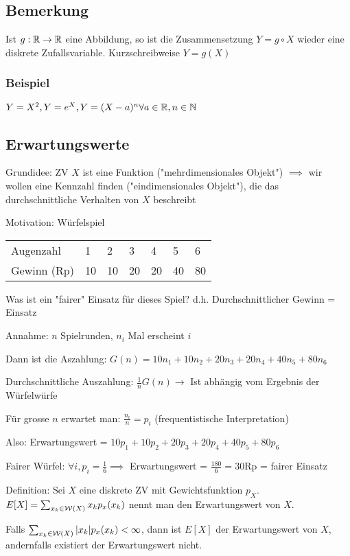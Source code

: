 \subsection{Bemerkung}
\enumstart
	\item Ist $g: \mathbb{R} \rightarrow \mathbb{R}$ eine Abbildung, so ist die Zusammensetzung $Y = g \circ X$ wieder eine diskrete Zufallsvariable. Kurzschreibweise $Y = g(X)$
\enumend

\subsubsection{Beispiel}
\enumstart
	\item $Y = X^2, Y = e^X, Y = (X-a)^n \forall a \in \mathbb{R}, n \in \mathbb{N}$
\enumend

\subsection{Erwartungswerte}
\enumstart
	\item Grundidee: ZV $X$ ist eine Funktion ("mehrdimensionales Objekt") $\implies$ wir wollen eine Kennzahl finden ("eindimensionales Objekt"), die das durchschnittliche Verhalten von $X$ beschreibt
	\item Motivation: Würfelspiel\\
	\begin{tabular}{lllllll}
		Augenzahl & 1 & 2 & 3 & 4 & 5 & 6\\
		Gewinn (Rp) & 10 & 10 & 20 & 20 & 40 & 80\\
	\end{tabular}
	\enumstart
		\item Was ist ein "fairer" Einsatz für dieses Spiel? d.h. Durchschnittlicher Gewinn = Einsatz
		\item Annahme: $n$ Spielrunden, $n_i$ Mal erscheint $i$
		\item Dann ist die Aszahlung: $G(n) = 10n_1 + 10n_2 + 20n_3 + 20n_4 + 40n_5 + 80n_6$
		\item Durchschnittliche Auszahlung: $\frac{1}{n}G(n) \rightarrow$ Ist abhängig vom Ergebnis der Würfelwürfe
		\item Für grosse $n$ erwartet man: $\frac{n_i}{n} = p_i$ (frequentistische Interpretation)
		\item Also: Erwartungswert = $10p_1 + 10p_2 + 20p_3 + 20p_4 + 40p_5 + 80p_6$
		\item Fairer Würfel: $\forall i, p_i = \frac{1}{6} \implies$ Erwartungswert = $\frac{180}{6} = 30$Rp = fairer Einsatz
	\enumend
	\item Definition: Sei $X$ eine diskrete ZV mit Gewichtsfunktion $p_X$. $E[X] = \sum_{x_k \in \mathcal{W}(X)}x_kp_x(x_k)$ nennt man den Erwartungswert von $X$.
	\item Falls $\sum_{x_k \in \mathcal{W}(X)}|x_k|p_x(x_k) < \infty$, dann ist $E[X]$ der Erwartungswert von $X$, andernfalls existiert der Erwartungswert nicht.
\enumend

